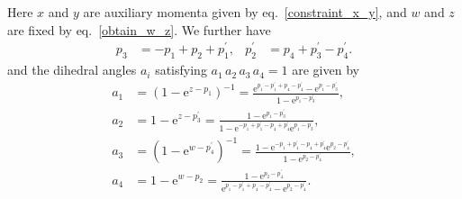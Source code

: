 \documentclass[12pt]{article}
\numberwithin{equation}{section}
\begin{document}
Here $x$ and $y$ are auxiliary momenta
given by eq.~\eqref{constraint_x_y}, and $w$ and $z$
are fixed by eq.~\eqref{obtain_w_z}.
We further have
\begin{align}
  p_3
  & = - p_1 + p_2 + p_1^\prime ,
  &
  p_2^\prime
  & = p_4 + p_3^\prime - p_4^\prime  .
\end{align}
and the dihedral angles $a_i$ satisfying
$a_1 \, a_2 \, a_3 \, a_4 = 1$ are given by
\begin{align*}
  a_1
  &=
  (1- \mathrm{e}^{z-p_1})^{-1}
  =
  \frac{
    \mathrm{e}^{p_1 - p_1^\prime + p_4 - p_4^\prime}
    - \mathrm{e}^{p_1 - p_3^\prime}}
  {1 - \mathrm{e}^{p_1 - p_3^\prime}} ,
  \\
%
  a_2
  &=
  1- \mathrm{e}^{z-p_3^\prime}
  =
  \frac{1 - \mathrm{e}^{p_1 - p_3^\prime}}
  {
    1
    - \mathrm{e}^{-p_1 + p_1^\prime - p_4 + p_4^\prime}
    \mathrm{e}^{p_1 - p_3^\prime}
    } ,
  \\
%
  a_3
  &=
  (1 - \mathrm{e}^{w-p_4^\prime})^{-1}
  =
  \frac{
    1 
    - \mathrm{e}^{-p_1 + p_1^\prime - p_4 + p_4^\prime}
    \mathrm{e}^{p_2 - p_4^\prime}
    } 
  {1 - \mathrm{e}^{p_2 - p_4^\prime}} ,
  \\
%
  a_4
  &=
  1 - \mathrm{e}^{w-p_2}
  =
  \frac{1 - \mathrm{e}^{p_2 - p_4^\prime}}
  {
    \mathrm{e}^{p_1 - p_1^\prime + p_4 - p_4^\prime}
    -
    \mathrm{e}^{p_2 - p_4^\prime}
    } .
\end{align*}
\end{document}
